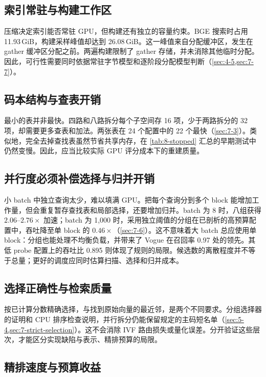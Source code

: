 \subsection{索引常驻与构建工作区}

压缩决定索引能否常驻 GPU，但构建还有独立的容量约束。BGE 搜索时占用 11.93\,GiB，构建采样峰值却达到 26.08\,GiB。这一峰值来自分配缓冲区，发生在 gather 缓冲区分配之前。两遍构建限制了 gather 存储，并未消除其他临时分配。因此，可行性需要同时依据常驻字节模型和逐阶段分配模型判断（\cref{sec:4-5,sec:7-7}）。

\subsection{码本结构与查表开销}

最小的表并非最快。四路和八路拆分每个子空间存 16 项，少于两路拆分的 32 项，却需要更多查表和加法。两张表在 24 个配置中的 22 个最快（\cref{sec:7-3}）。类似地，完全去掉查找表虽然节省共享内存，在 \cref{tab:8-stopped} 汇总的早期测试中仍然变慢。因此，应当比较实际 GPU 评分成本下的重建质量。

\subsection{并行度必须补偿选择与归并开销}

小 batch 中独立查询太少，难以填满 GPU。把每个查询分到多个 block 能增加工作量，但会重复暂存查找表和局部选择，还要增加归并。batch 为 8 时，八组获得 $2.06$--$2.76\times$ 加速；batch 为 1,000 时，采用独立阈值的分组在已剖析的高预算配置中，吞吐降至单 block 的 $0.46\times$（\cref{sec:7-6}）。这不意味着大 batch 总应使用单 block：分组也能处理不均衡负载，并带来了 Vogue 在召回率 0.97 处的领先。其低 probe 配置上的吞吐比 0.895 则体现了规则的局限。候选数的离散程度并不等于总量；更好的调度应同时估算扫描、选择和归并成本。

\subsection{选择正确性与检索质量}

按已计算分数精确选择，与找到原始向量的最近邻，是两个不同要求。分组选择器的证明和 CPU 排序检查说明，并行拆分仍能保留规定的主码短名单（\cref{sec:5-4,sec:7-strict-selection}）。这不会消除 IVF 路由损失或量化误差。分开验证这些层次，才能区分实现缺陷与表示、精排预算的局限。

\subsection{精排速度与预算收益}


